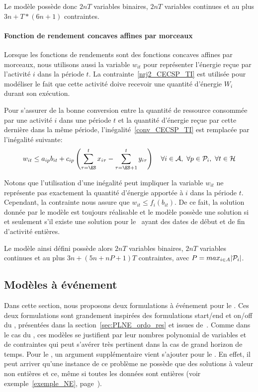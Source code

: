 Le modèle possède donc $2nT$ variables binaires, $2nT$ variables
continues et au plus $3n+T*(6n+1)$ contraintes.

\paragraph{Fonction de rendement concaves affines par morceaux}

Lorsque les fonctions de rendements sont des fonctions concaves
affines par morceaux, nous utilisons aussi la variable $w_{it}$ pour
représenter l'énergie reçue par l'activité $i$ dans la période $t$. La
contrainte~\eqref{nrj2_CECSP_TI} est utilisée pour modéliser le fait
que cette activité doive recevoir une quantité d'énergie $W_i$ durant
son exécution. 

Pour s'assurer de la bonne conversion entre la quantité de ressource
consommée par une activité $i$ dans une période $t$ et la quantité
d'énergie reçue par cette dernière dans la même période,
l'inégalité~\eqref{conv_CECSP_TI} est remplacée par l'inégalité
suivante: 
\begin{equation}
w_{it} \le a_{ip}b_{it} + c_{ip}\left(\sum_{\tau=\ES}^t
x_{i\tau}-\sum_{\tau=\ES+1}^t y_{i\tau}\right) \quad  \forall i \in
\A,\ \forall p \in \P_i,\ \forall t \in \H 
\label{conv_CECSP_TI}
\end{equation}

Notons que l'utilisation d'une inégalité peut impliquer la variable
$w_{it}$ ne représente pas exactement la quantité d'énergie apportée à
$i$ dans la période $t$. Cependant, la contrainte nous assure que
$w_{it} \le f_i(b_{it})$. De ce fait, la solution donnée par le modèle
est toujours réalisable et le modèle possède une solution si et
seulement s'il existe une solution pour le \CECSP~ayant des dates de
début et de fin d'activité entières.

Le modèle ainsi défini possède alors $2nT$ variables binaires, $2nT$
variables continues et au plus $3n + (5n +nP+1)T$ contraintes, avec
$P=max_{i\in A}|\P_i|$.  

\subsection{Modèles à événement}

Dans cette section, nous proposons deux formulations à événement pour
le \CECSP. Ces deux formulations sont grandement inspirées des
formulations start/end et on/off du \RCPSP, présentées dans la
section~\ref{sec:PLNE_ordo_res} et issues
de~\cite{modele_RCPSP}. Comme dans le cas du \RCPSP, ces modèles se
justifient par leur nombres polynomial de variables et de contraintes
qui peut s'avérer très pertinent dans la cas de grand horizon de
temps. Pour le \CECSP, un argument supplémentaire vient s'ajouter pour
le \CECSP. En effet, il peut arriver qu'une instance de ce problème ne
possède que des solutions à valeur non entières et ce, même si toutes
les données sont entières (voir exemple~\ref{exemple_NE},
page~\pageref{exemple_NE}).


